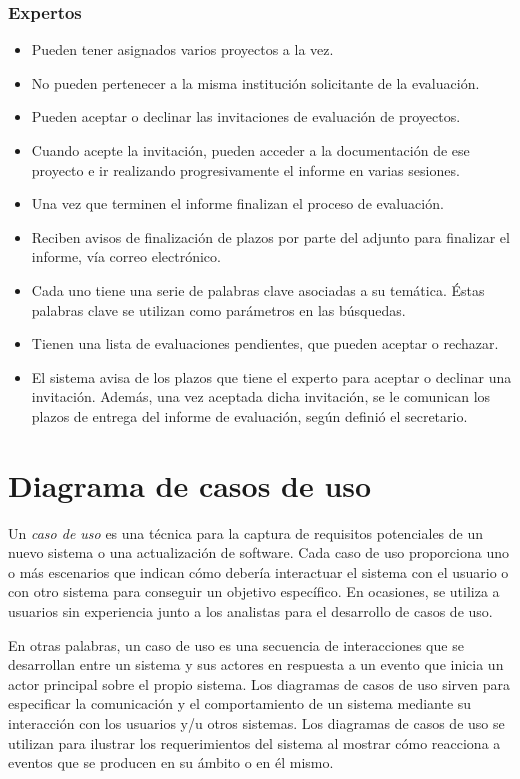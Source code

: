 \documentclass[11pt,a4paper,spanish,twoside]{book}
\begin{document}
\subsection{Expertos}
\begin{itemize}
\item Pueden tener asignados varios proyectos a la vez. 
\item No pueden pertenecer a la misma institución solicitante de la evaluación.
\item Pueden aceptar o declinar las invitaciones de evaluación de proyectos.
\item Cuando acepte la invitación, pueden acceder a la documentación de ese
  proyecto e ir realizando progresivamente el informe en varias sesiones. 
\item Una vez que terminen el informe finalizan el proceso de evaluación.
\item Reciben avisos de finalización de plazos por parte del adjunto para
  finalizar el informe, vía correo electrónico.
\item Cada uno tiene una serie de palabras clave asociadas a su
  temática. Éstas palabras clave se utilizan como parámetros en las
  búsquedas. 
\item Tienen una lista de evaluaciones pendientes, que pueden aceptar o 
  rechazar.
\item El sistema avisa de los plazos que tiene el experto para aceptar o
  declinar una invitación. Además, una vez aceptada dicha invitación, se le
  comunican los plazos de entrega del informe de evaluación, según definió
  el secretario.

\end{itemize}

\chapter{Diagrama de casos de uso}
Un \emph{caso de uso} es una técnica para la captura de requisitos
potenciales de un nuevo sistema o una actualización de software. Cada caso de
uso proporciona uno o más escenarios que indican cómo debería interactuar el
sistema con el usuario o con otro sistema para conseguir un objetivo
específico. En ocasiones, se utiliza a usuarios sin experiencia junto a los
analistas para el desarrollo de casos de uso.

En otras palabras, un caso de uso es una secuencia de interacciones que se
desarrollan entre un sistema y sus actores en respuesta a un evento que
inicia un actor principal sobre el propio sistema. Los diagramas de casos de
uso sirven para especificar la comunicación y el comportamiento de un sistema
mediante su interacción con los usuarios y/u otros sistemas. Los diagramas de
casos de uso se utilizan para ilustrar los requerimientos del sistema al
mostrar cómo reacciona a eventos que se producen en su ámbito o en él mismo.
\end{document}
